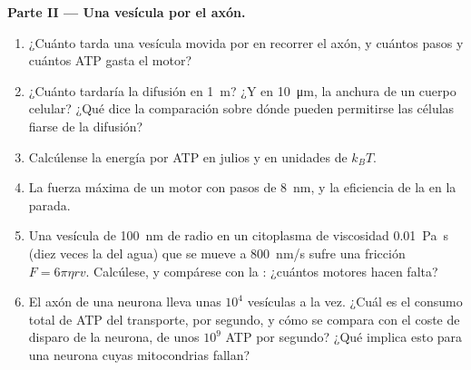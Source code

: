 \begin{problem}
\medskip
\noindent\textbf{Parte II --- Una vesícula por el axón.}
\begin{enumerate}[resume]
  \item ¿Cuánto tarda una vesícula movida por  en recorrer el
        axón, y cuántos pasos y cuántos ATP gasta el motor?
  \item ¿Cuánto tardaría la difusión en \qty{1}{m}? ¿Y en
        \qty{10}{\micro m}, la anchura de un cuerpo celular? ¿Qué dice la
        comparación sobre dónde pueden permitirse las células fiarse de
        la difusión?
  \item Calcúlense la energía por ATP en julios y en unidades de
        $k_{B}T$.
  \item La fuerza máxima de un motor con pasos de \qty{8}{nm}, y la
        eficiencia de la  en la parada.
  \item Una vesícula de \qty{100}{nm} de radio en un citoplasma de
        viscosidad \qty{0.01}{Pa.s} (diez veces la del agua) que se mueve
        a \qty{800}{nm/s} sufre una fricción $F = 6\pi\eta r v$.
        Calcúlese, y compárese con la : ¿cuántos motores
        hacen falta?
  \item El axón de una neurona lleva unas $10^{4}$ vesículas a la vez.
        ¿Cuál es el consumo total de ATP del transporte, por segundo, y
        cómo se compara con el coste de disparo de la neurona, de unos
        $10^{9}$ ATP por segundo? ¿Qué implica esto para una neurona
        cuyas mitocondrias fallan?
\end{enumerate}


\end{problem}
